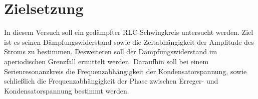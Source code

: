  \section{Zielsetzung}
 \label{sec:Zielsetzung}
        In diesem Versuch soll ein gedämpfter RLC-Schwingkreis untersucht werden. Ziel ist es seinen Dämpfungswiderstand sowie die Zeitabhängigkeit der Amplitude des Stroms zu bestimmen. Desweiteren soll der Dämpfungswiderstand im aperiodischen Grenzfall ermittelt werden. Daraufhin soll bei einem Serienresonanzkreis die Frequenzabhängigkeit der Kondensatorspannung, sowie schließlich
        die Frequenzabhängigkeit der Phase zwischen Erreger- und Kondensatorspannung bestimmt werden.